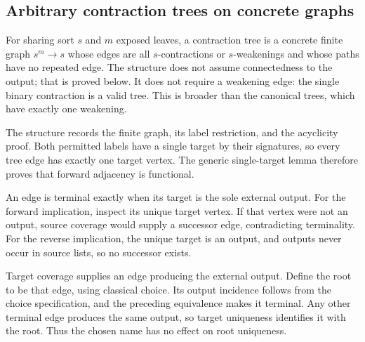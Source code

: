 \subsection{Arbitrary contraction trees on concrete graphs}
For sharing sort $s$ and $m$ exposed leaves, a contraction tree is a concrete
finite graph $s^m\to s$ whose edges are all $s$-contractions or $s$-weakenings
and whose paths have no repeated edge. The structure does not assume
connectedness to the output; that is proved below. It does not require a
weakening edge: the single binary contraction is a valid tree. This is
broader than the canonical trees, which have exactly one weakening.

The structure records the finite graph, its label restriction, and the
acyclicity proof. Both permitted labels have a single target by their
signatures, so every tree edge has exactly one target vertex. The generic
single-target lemma therefore proves that forward adjacency is functional.




An edge is terminal exactly when its target is the sole external output.
For the forward implication, inspect its unique target vertex. If that
vertex were not an output, source coverage would supply a successor edge,
contradicting terminality. For the reverse implication, the unique target
is an output, and outputs never occur in source lists, so no successor
exists.

Target coverage supplies an edge producing the external output. Define the
root to be that edge, using classical choice. Its output incidence follows
from the choice specification, and the preceding equivalence makes it
terminal. Any other terminal edge produces the same output, so target
uniqueness identifies it with the root. Thus the chosen name has no effect
on root uniqueness.





